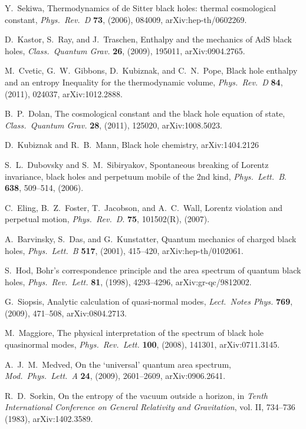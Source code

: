 \documentclass[12pt]{article}
\begin{document}
\begin{thebibliography}{999}
 Y.\ Sekiwa, Thermodynamics of de Sitter black
 holes: thermal cosmological constant, \emph{Phys.\ Rev.\ D}
{\bf 73}, (2006), 084009, arXiv:hep-th/0602269.

 D.\ Kastor, S.\ Ray, and J.\ Traschen, Enthalpy and 
the mechanics of AdS black holes, \emph{Class.\ Quantum Grav.}
{\bf 26}, (2009), 195011, arXiv:0904.2765.

 M.\ Cvetic, G.~W.\ Gibbons, D.\ Kubiznak, and
C.~N.\ Pope, Black hole enthalpy and an entropy Inequality for the 
thermodynamic volume, \emph{Phys.\ Rev.\ D} {\bf 84}, (2011),
024037, arXiv:1012.2888.

 B.~P.\ Dolan, The cosmological constant and 
the black hole equation of state, \emph{Class.\ Quantum Grav.}
{\bf 28}, (2011), 125020, arXiv:1008.5023.

  D.\ Kubiznak and R.~B.\ Mann, Black hole
chemistry, arXiv:1404.2126

 S.~L.\ Dubovsky and S.~M.\ Sibiryakov, Spontaneous
breaking of Lorentz invariance, black holes and perpetuum mobile of
the 2nd kind, \emph{Phys.\ Lett.\ B}. {\bf 638}, 509--514, (2006).

 C.\ Eling, B.~Z.\ Foster, T.\ Jacobson, and A.~C.\ Wall,
Lorentz violation and perpetual motion, \emph{Phys.\ Rev.\ D}. {\bf 75},
101502(R), (2007).

 A.\ Barvinsky, S.\ Das, and G.\ Kunstatter,
Quantum mechanics of charged black holes, \emph{Phys.\ Lett.\ B}
{\bf 517}, (2001), 415--420, arXiv:hep-th/0102061.

 S.\ Hod, Bohr's correspondence principle and the 
area spectrum of quantum black holes, \emph{Phys.\ Rev.\ Lett.}
{\bf 81}, (1998), 4293--4296, arXiv:gr-qc/9812002.

 G.\ Siopsis, Analytic calculation of quasi-normal 
modes, \emph{Lect.\ Notes Phys.} {\bf 769}, (2009), 471--508,
arXiv:0804.2713.

 M.\ Maggiore, The physical interpretation of 
the spectrum of black hole quasinormal modes, \emph{Phys.\ 
Rev.\ Lett.} {\bf 100}, (2008), 141301, arXiv:0711.3145.

 A.~J.~M.\ Medved, On the `universal' quantum 
area spectrum, \emph{Mod.\ Phys.\ Lett.\ A} {\bf 24}, (2009), 
2601--2609, arXiv:0906.2641.

 R.~D.\ Sorkin, On the entropy of the vacuum outside 
a horizon, in \emph{Tenth International Conference on General Relativity 
and Gravitation}, vol. II, 734--736 (1983), arXiv:1402.3589.


\end{thebibliography}
\end{document}
